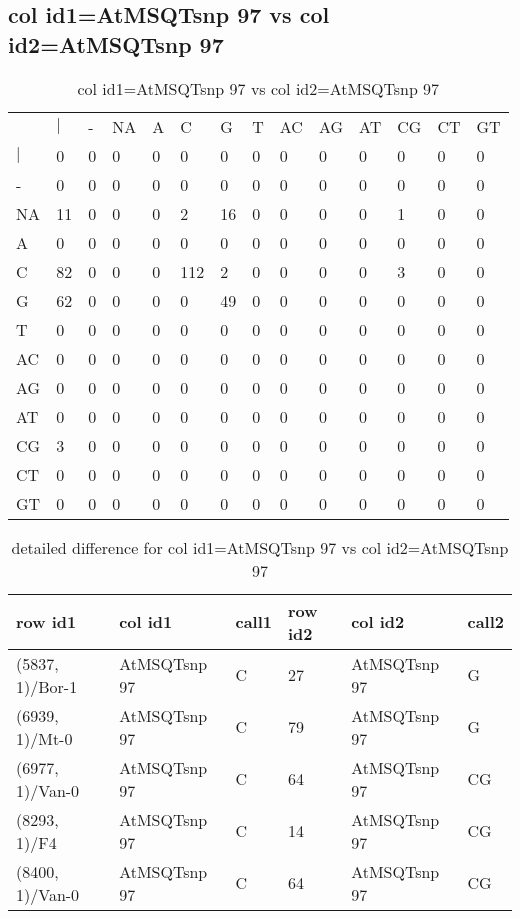 \subsection{col id1=AtMSQTsnp 97 vs col id2=AtMSQTsnp 97}
\begin{center}
\begin{longtable}{|l|l|l|l|l|l|l|l|l|l|l|l|l|l|}
\caption{col id1=AtMSQTsnp 97 vs col id2=AtMSQTsnp 97} \label{table_dm984}\\
\hline
\\
\hline
&$|$&-&NA&A&C&G&T&AC&AG&AT&CG&CT&GT\\
$|$&0&0&0&0&0&0&0&0&0&0&0&0&0\\
-&0&0&0&0&0&0&0&0&0&0&0&0&0\\
NA&11&0&0&0&2&16&0&0&0&0&1&0&0\\
A&0&0&0&0&0&0&0&0&0&0&0&0&0\\
C&82&0&0&0&112&2&0&0&0&0&3&0&0\\
G&62&0&0&0&0&49&0&0&0&0&0&0&0\\
T&0&0&0&0&0&0&0&0&0&0&0&0&0\\
AC&0&0&0&0&0&0&0&0&0&0&0&0&0\\
AG&0&0&0&0&0&0&0&0&0&0&0&0&0\\
AT&0&0&0&0&0&0&0&0&0&0&0&0&0\\
CG&3&0&0&0&0&0&0&0&0&0&0&0&0\\
CT&0&0&0&0&0&0&0&0&0&0&0&0&0\\
GT&0&0&0&0&0&0&0&0&0&0&0&0&0\\
\hline
\end{longtable}
\end{center}

\begin{center}
\begin{longtable}{|l|l|l|l|l|l|}
\caption{detailed difference for col id1=AtMSQTsnp 97 vs col id2=AtMSQTsnp 97} \label{table_dm985}\\
\hline
row id1&col id1&call1&row id2&col id2&call2\\
\hline
(5837, 1)/Bor-1&AtMSQTsnp 97&C&27&AtMSQTsnp 97&G\\
(6939, 1)/Mt-0&AtMSQTsnp 97&C&79&AtMSQTsnp 97&G\\
(6977, 1)/Van-0&AtMSQTsnp 97&C&64&AtMSQTsnp 97&CG\\
(8293, 1)/F4&AtMSQTsnp 97&C&14&AtMSQTsnp 97&CG\\
(8400, 1)/Van-0&AtMSQTsnp 97&C&64&AtMSQTsnp 97&CG\\
\hline
\end{longtable}
\end{center}

